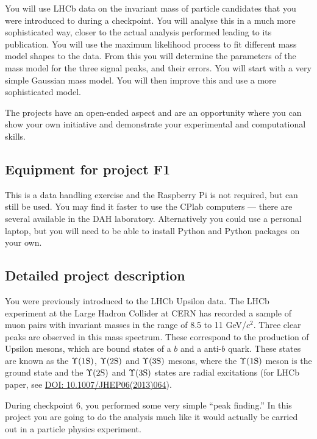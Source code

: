 You will use LHCb data on the invariant mass of particle candidates that you were introduced to during a checkpoint.
You will analyse this in a much more sophisticated way, closer to the actual analysis performed leading to its publication.
You will use the maximum likelihood process to fit different mass model shapes to the data.
From this you will determine the parameters of the mass model for the three signal peaks, and their errors.
You will start with a very simple Gaussian mass model.
You will then improve this and use a more sophisticated model.

The projects have an open-ended aspect and are an opportunity where you can show your own initiative and demonstrate your experimental and computational skills. 

\subsection{Equipment for project F1}

This is a data handling exercise and the Raspberry Pi is not required, but can still be used.
You may find it faster to use the CPlab computers --- there are several available in the DAH laboratory.
Alternatively you could use a personal laptop, but you will need to be able to install Python and Python packages on your own.

\subsection{Detailed project description}
  
You were previously introduced to the LHCb Upsilon data. 
The LHCb experiment at the Large Hadron Collider at CERN has recorded a sample of muon pairs with invariant masses in the range of 8.5 to 11 GeV/$c^2$.
Three clear peaks are observed in this mass spectrum.
These correspond to the production of Upsilon mesons, which are bound states of a $b$ and a anti-$b$ quark.
These states are known as the $\Upsilon \rm (1S)$, $\Upsilon \rm (2S)$ and $\Upsilon \rm (3S)$ mesons, where the $\Upsilon \rm (1S)$ meson is the ground state and the $\Upsilon \rm (2S)$ and $\Upsilon \rm (3S)$ states are radial excitations (for LHCb paper, see \href{https://link.springer.com/article/10.1007/JHEP06(2013)064}{DOI: 10.1007/JHEP06(2013)064}).

During checkpoint 6, you performed some very simple ``peak finding.''
In this project you are going to do the analysis much like it would actually be carried out in a particle physics experiment.

